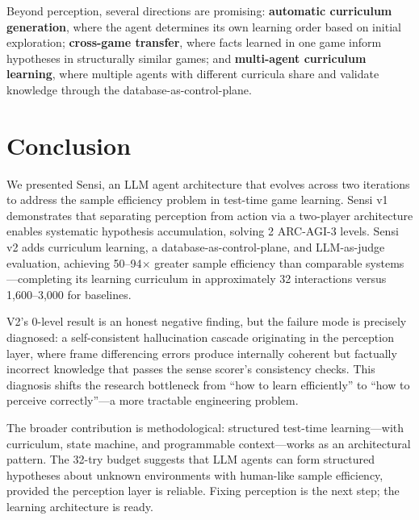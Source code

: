 \documentclass[11pt,letterpaper]{article}
\begin{document}
Beyond perception, several directions are promising: \textbf{automatic curriculum generation}, where the agent determines its own learning order based on initial exploration; \textbf{cross-game transfer}, where facts learned in one game inform hypotheses in structurally similar games; and \textbf{multi-agent curriculum learning}, where multiple agents with different curricula share and validate knowledge through the database-as-control-plane.


\section{Conclusion}
\label{sec:conclusion}

We presented Sensi, an LLM agent architecture that evolves across two iterations to address the sample efficiency problem in test-time game learning. Sensi v1 demonstrates that separating perception from action via a two-player architecture enables systematic hypothesis accumulation, solving 2 ARC-AGI-3 levels. Sensi v2 adds curriculum learning, a database-as-control-plane, and LLM-as-judge evaluation, achieving 50--94$\times$ greater sample efficiency than comparable systems---completing its learning curriculum in approximately 32 interactions versus 1,600--3,000 for baselines.

V2's 0-level result is an honest negative finding, but the failure mode is precisely diagnosed: a self-consistent hallucination cascade originating in the perception layer, where frame differencing errors produce internally coherent but factually incorrect knowledge that passes the sense scorer's consistency checks. This diagnosis shifts the research bottleneck from ``how to learn efficiently'' to ``how to perceive correctly''---a more tractable engineering problem.

The broader contribution is methodological: structured test-time learning---with curriculum, state machine, and programmable context---works as an architectural pattern. The 32-try budget suggests that LLM agents can form structured hypotheses about unknown environments with human-like sample efficiency, provided the perception layer is reliable. Fixing perception is the next step; the learning architecture is ready.

\end{document}
